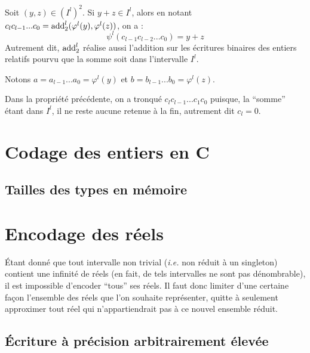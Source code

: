 			\eqskip{3mm}
			\begin{Propriete}
				Soit \((y,z)\in (I^l)^2\). Si \(y+z\in I^l\), alors en notant \(c_lc_{l-1}...c_0=\operatorname{add}_2^l(\varphi^l(y),\varphi^l(z))\), on a :
					\[
						\psi^l(c_{l-1}c_{l-2}...c_0) = y+z
					\]
				Autrement dit, \(\operatorname{add}_2^l\) réalise aussi l'addition sur les écritures binaires des entiers relatifs pourvu que la somme soit dans l'intervalle \(I^l\).
			\end{Propriete}
				
				\begin{Preuve}
					Notons \(a=a_{l-1}...a_0=\varphi^l(y)\) et \(b=b_{l-1}...b_0=\varphi^l(z)\).
				\end{Preuve}
			
				\begin{Remarque}
					Dans la propriété précédente, on a tronqué \(c_lc_{l-1}...c_1c_0\) puisque, la ``somme'' étant dans \(I^l\), il ne reste aucune retenue à la fin, autrement dit \(c_l=0\).
				\end{Remarque}
			
\section{Codage des entiers en C}

	\subsection{Tailles des types en mémoire}
				
\section{Encodage des réels}
	
	\'Etant donné que tout intervalle non trivial (\emph{i.e.} non réduit à un singleton) contient une infinité de réels (en fait, de tels intervalles ne sont pas dénombrable), il est impossible d'encoder ``tous'' ses réels. Il faut donc limiter d'une certaine façon l'ensemble des réels que l'on souhaite représenter, quitte à seulement approximer tout réel qui n'appartiendrait pas à ce nouvel ensemble réduit.
	
	\subsection{\'Ecriture à précision arbitrairement élevée}
	
